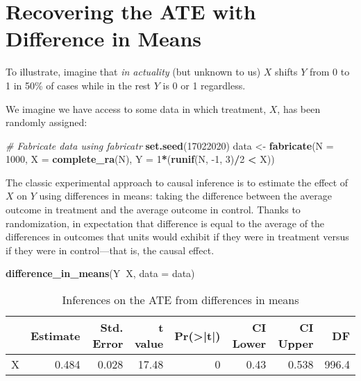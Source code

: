 \documentclass[
  12pt,
]{book}
\newenvironment{Shaded}{\begin{snugshade}}{\end{snugshade}}
\newcommand{\CommentTok}[1]{\textcolor[rgb]{0.56,0.35,0.01}{\textit{#1}}}
\newcommand{\DataTypeTok}[1]{\textcolor[rgb]{0.13,0.29,0.53}{#1}}
\newcommand{\DecValTok}[1]{\textcolor[rgb]{0.00,0.00,0.81}{#1}}
\newcommand{\KeywordTok}[1]{\textcolor[rgb]{0.13,0.29,0.53}{\textbf{#1}}}
\newcommand{\NormalTok}[1]{#1}
\newcommand{\OperatorTok}[1]{\textcolor[rgb]{0.81,0.36,0.00}{\textbf{#1}}}
\newcommand{\StringTok}[1]{\textcolor[rgb]{0.31,0.60,0.02}{#1}}
\begin{document}
\hypertarget{recovering-the-ate-with-difference-in-means}{%
\section{Recovering the ATE with Difference in Means}\label{recovering-the-ate-with-difference-in-means}}

To illustrate, imagine that \emph{in actuality} (but unknown to us) \(X\) shifts \(Y\) from 0 to 1 in 50\% of cases while in the rest \(Y\) is 0 or 1 regardless.

We imagine we have access to some data in which treatment, \(X\), has been randomly assigned:

\begin{Shaded}
\begin{Highlighting}[]
\CommentTok{# Fabricate data using fabricatr}
\KeywordTok{set.seed}\NormalTok{(}\DecValTok{17022020}\NormalTok{)}
\NormalTok{data  <-}\StringTok{ }\KeywordTok{fabricate}\NormalTok{(}\DataTypeTok{N =} \DecValTok{1000}\NormalTok{, }\DataTypeTok{X =} \KeywordTok{complete_ra}\NormalTok{(N), }\DataTypeTok{Y =} \DecValTok{1}\OperatorTok{*}\NormalTok{(}\KeywordTok{runif}\NormalTok{(N, }\DecValTok{-1}\NormalTok{, }\DecValTok{3}\NormalTok{)}\OperatorTok{/}\DecValTok{2} \OperatorTok{<}\StringTok{ }\NormalTok{X))}
\end{Highlighting}
\end{Shaded}

The classic experimental approach to causal inference is to estimate the effect of \(X\) on \(Y\) using differences in means: taking the difference between the average outcome in treatment and the average outcome in control. Thanks to randomization, in expectation that difference is equal to the average of the differences in outcomes that units would exhibit if they were in treatment versus if they were in control---that is, the causal effect.

\begin{Shaded}
\begin{Highlighting}[]
\KeywordTok{difference_in_means}\NormalTok{(Y}\OperatorTok{~}\NormalTok{X, }\DataTypeTok{data =}\NormalTok{ data)}
\end{Highlighting}
\end{Shaded}

\begin{table}

\caption{\label{tab:unnamed-chunk-5}Inferences on the ATE from differences in means}
\centering
\begin{tabular}[t]{l|r|r|r|r|r|r|r}
\hline
  & Estimate & Std. Error & t value & Pr(>|t|) & CI Lower & CI Upper & DF\\
\hline
X & 0.484 & 0.028 & 17.48 & 0 & 0.43 & 0.538 & 996.4\\
\hline
\end{tabular}
\end{table}
\end{document}
